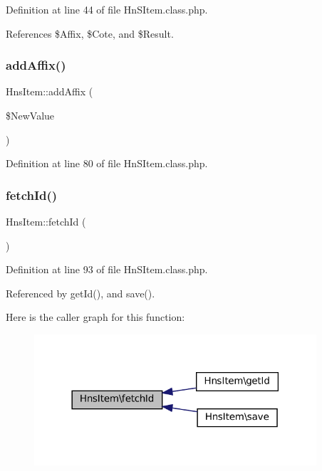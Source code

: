 Definition at line 44 of file Hn\+S\+Item.\+class.\+php.



References \$\+Affix, \$\+Cote, and \$\+Result.

\mbox{\label{class_hns_item_add602751df64740948324ec012e6b299}} 
\subsubsection{\texorpdfstring{add\+Affix()}{addAffix()}}
{\footnotesize\ttfamily Hns\+Item\+::add\+Affix (\begin{DoxyParamCaption}\item[{}]{\$\+New\+Value }\end{DoxyParamCaption})}



Definition at line 80 of file Hn\+S\+Item.\+class.\+php.

\mbox{\label{class_hns_item_a177defe3ff5dee71b06ac457c3c20e4e}} 
\subsubsection{\texorpdfstring{fetch\+Id()}{fetchId()}}
{\footnotesize\ttfamily Hns\+Item\+::fetch\+Id (\begin{DoxyParamCaption}{ }\end{DoxyParamCaption})\hspace{0.3cm}{\ttfamily [private]}}



Definition at line 93 of file Hn\+S\+Item.\+class.\+php.



Referenced by get\+Id(), and save().

Here is the caller graph for this function\+:\nopagebreak
\begin{figure}[H]
\begin{center}
\leavevmode
\includegraphics[width=297pt]{class_hns_item_a177defe3ff5dee71b06ac457c3c20e4e_icgraph}
\end{center}
\end{figure}
\mbox{\label{class_hns_item_a264b19ff1bd548f7e315827fb0099d51}} 
